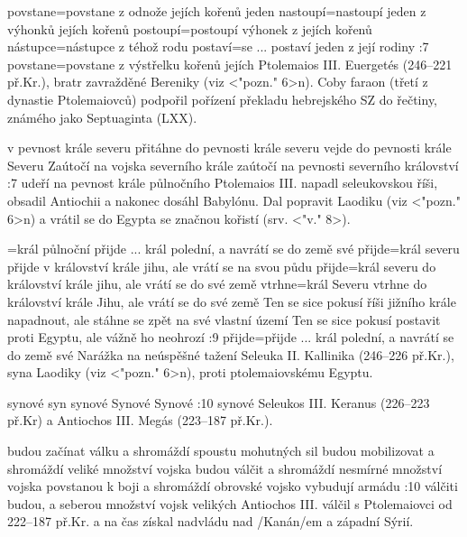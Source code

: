     {povstane}={povstane z odnože jejích kořenů jeden}   %
    {nastoupí}={nastoupí jeden z výhonků jejích kořenů}   %
    {postoupí}={postoupí výhonek z jejích kořenů}   %
    {nástupce}={nástupce z téhož rodu}   %
    {postaví}={se ... postaví jeden z její rodiny}   %
:7 {povstane}={povstane z výstřelku kořenů jejích}  Ptolemaios  III. Euergetés (246--221         př.Kr.), bratr zavražděné Bereniky (viz <"pozn." 6>n). Coby faraon (třetí z dynastie     Ptolemaiovců) podpořil pořízení překladu hebrejského SZ do řečtiny, známého jako Septuaginta (LXX). 


    {v pevnost krále severu}   %
    {přitáhne do pevnosti krále severu}   %
    {vejde do pevnosti krále Severu}   %
    {Zaútočí na vojska severního krále}   %
    {zaútočí na pevnosti severního království}   %
:7 {udeří na pevnost krále půlnočního}  
    Ptolemaios III. napadl seleukovskou říši, obsadil Antiochii a nakonec dosáhl Babylónu. Dal popravit Laodiku (viz <"pozn." 6>n) a vrátil se do Egypta se značnou kořistí (srv. <"v." 8>).


={král půlnoční přijde ... král polední, a navrátí se do země své}   %
    {přijde}={král severu přijde v království krále jihu, ale vrátí se na svou půdu}   %
    {přijde}={král severu do království krále jihu, ale vrátí se do své země}   %
    {vtrhne}={král Severu vtrhne do království krále Jihu, ale vrátí se do své země}   %
    {Ten se sice pokusí říši jižního krále napadnout, ale stáhne se zpět na své vlastní území}  %
    {Ten se sice pokusí postavit proti Egyptu, ale vážně ho neohrozí}  %
:9 {přijde}={přijde ... král polední, a navrátí se do země své}  
    Narážka na neúspěšné tažení Seleuka II. Kallinika (246--226 př.Kr.), syna Laodiky (viz <"pozn." 6>n), proti ptolemaiovskému Egyptu.

    {synové} %
    {syn}  %
    {synové} %
    {Synové}  %
    {Synové}  %
:10 {synové} Seleukos III. Keranus (226--223 př.Kr) a Antiochos III. Megás (223--187 př.Kr.).

    {budou začínat válku a shromáždí spoustu mohutných sil}   %
    {budou mobilizovat a shromáždí veliké množství vojska}   %
    {budou válčit a shromáždí nesmírné množství vojska}   %
    {povstanou k boji a shromáždí obrovské vojsko}   %
    {vybudují armádu}   %
:10 {válčiti budou, a seberou množství vojsk velikých}
    Antiochos III. válčil s Ptolemaiovci od 222--187 př.Kr. a na čas získal nadvládu nad \x/Kanán/em a západní Sýrií. 

